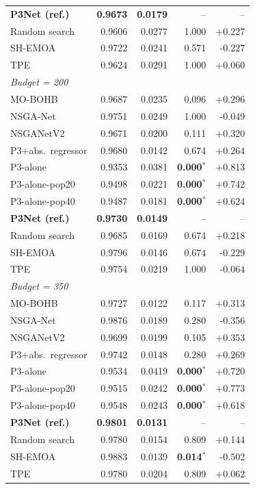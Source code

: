 \begin{table}[t]
\begin{tabular}{@{}lrrrr@{}}
        \textbf{P3Net (ref.)} & \textbf{0.9673} & \textbf{0.0179} & -- & -- \\
        Random search & 0.9606 & 0.0277 & 1.000 & +0.227 \\
        SH-EMOA & 0.9722 & 0.0241 & 0.571 & -0.227 \\
        TPE & 0.9624 & 0.0291 & 1.000 & +0.060 \\
        \midrule
        \multicolumn{5}{l}{\emph{Budget = 200}} \\
        MO-BOHB & 0.9687 & 0.0235 & 0.096 & +0.296 \\
        NSGA-Net & 0.9751 & 0.0249 & 1.000 & -0.049 \\
        NSGANetV2 & 0.9671 & 0.0200 & 0.111 & +0.320 \\
        P3+abs.\ regressor & 0.9680 & 0.0142 & 0.674 & +0.264 \\
        P3-alone & 0.9353 & 0.0381 & \textbf{0.000$^{*}$} & +0.813 \\
        P3-alone-pop20 & 0.9498 & 0.0221 & \textbf{0.000$^{*}$} & +0.742 \\
        P3-alone-pop40 & 0.9487 & 0.0181 & \textbf{0.000$^{*}$} & +0.624 \\
        \textbf{P3Net (ref.)} & \textbf{0.9730} & \textbf{0.0149} & -- & -- \\
        Random search & 0.9685 & 0.0169 & 0.674 & +0.218 \\
        SH-EMOA & 0.9796 & 0.0146 & 0.674 & -0.229 \\
        TPE & 0.9754 & 0.0219 & 1.000 & -0.064 \\
        \midrule
        \multicolumn{5}{l}{\emph{Budget = 350}} \\
        MO-BOHB & 0.9727 & 0.0122 & 0.117 & +0.313 \\
        NSGA-Net & 0.9876 & 0.0189 & 0.280 & -0.356 \\
        NSGANetV2 & 0.9699 & 0.0199 & 0.105 & +0.353 \\
        P3+abs.\ regressor & 0.9742 & 0.0148 & 0.280 & +0.269 \\
        P3-alone & 0.9534 & 0.0419 & \textbf{0.000$^{*}$} & +0.720 \\
        P3-alone-pop20 & 0.9515 & 0.0242 & \textbf{0.000$^{*}$} & +0.773 \\
        P3-alone-pop40 & 0.9548 & 0.0243 & \textbf{0.000$^{*}$} & +0.618 \\
        \textbf{P3Net (ref.)} & \textbf{0.9801} & \textbf{0.0131} & -- & -- \\
        Random search & 0.9780 & 0.0154 & 0.809 & +0.144 \\
        SH-EMOA & 0.9883 & 0.0139 & \textbf{0.014$^{*}$} & -0.502 \\
        TPE & 0.9780 & 0.0204 & 0.809 & +0.062 \\
        \bottomrule
    \end{tabular}
\end{table}


